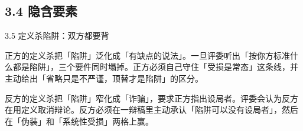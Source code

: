 \documentclass[prep,both]{debate}
\begin{document}
\subsection{3.4 隐含要素}
\begin{fields}
\end{fields}

\begin{warnbox}{3.5 定义杀陷阱：双方都要背}
\begin{fields}
\begin{procard}{正方的定义杀}把「陷阱」泛化成「有缺点的说法」。一旦评委听出「按你方标准什么都是陷阱」，三个要件同时塌掉。正方必须自己守住「受损是常态」这条线，并主动给出「省略只是不严谨，顶替才是陷阱」的区分。\end{procard}
\begin{concard}{反方的定义杀}把「陷阱」窄化成「诈骗」，要求正方指出设局者。评委会认为反方在用定义取消辩论。反方必须在一辩稿里主动承认「陷阱可以没有设局者」，然后在「伪装」和「系统性受损」两格上赢。\end{concard}
\end{fields}
\end{warnbox}
\end{document}
